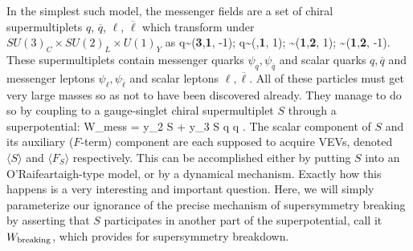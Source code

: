 In the simplest such model, the messenger fields are
a  set of chiral supermultiplets
$q$, $\overline q$, $\ell$, $\overline \ell$ which transform under
$SU(3)_C\times SU(2)_L\times U(1)_Y$ as
\beq
q\sim({\bf 3},{\bf 1}, -{1});\qquad\!\!\!
\overline q\sim({\bf {}},{\bf 1}, {1});\qquad\!\!\!
\ell \sim({\bf 1},{\bf 2}, {1});\qquad\!\!\!
\overline \ell\sim({\bf 1},{\bf 2}, -{1}).\qquad\!\!\!{}
\label{minimalmess}
\eeq
These supermultiplets contain messenger quarks 
$\psi_q, \psi_{\overline q}$ and scalar quarks $q, \overline q$
and messenger leptons
$\psi_\ell, \psi_{\overline \ell}$ and scalar leptons $\ell, \overline
\ell$. All of these particles
must get very large masses so as not to have been
discovered already. They manage to do so by coupling to a gauge-singlet
chiral supermultiplet
$S$ through a superpotential:
\beq
W_{\rm mess} = y_2 S \ell \overline \ell + y_3 S q \overline q .
\eeq
The scalar component of $S$ and its auxiliary ($F$-term) component are
each supposed to acquire VEVs, denoted $\langle S \rangle $ and
$\langle F_S \rangle $ respectively.
This can be accomplished either by putting $S$ into an
O'Rai\-f\-ear\-taigh-type model,\cite{oldgmsb} or by a dynamical
mechanism.\cite{newgmsb}
Exactly how this happens is a very
interesting and important question. Here, we will 
simply parameterize our ignorance of
the precise mechanism of supersymmetry breaking by asserting that
$S$ participates in another part of the superpotential, call it
$W_{\rm breaking}$, which provides for supersymmetry breakdown.


